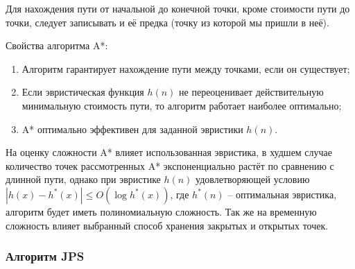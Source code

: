 Для нахождения пути от начальной до конечной точки, кроме стоимости пути до точки, следует записывать и её предка (точку из которой мы пришли в неё).


Свойства алгоритма A*:

\begin{enumerate}
    \item Алгоритм гарантирует нахождение пути между точками, если он существует;
    \item Если эвристическая функция $h(n)$ не переоценивает действительную минимальную стоимость пути, то алгоритм работает наиболее оптимально;
    \item A* оптимально эффективен для заданной эвристики $h(n)$.
\end{enumerate}

На оценку сложности A* влияет использованная эвристика, в худшем случае количество точек рассмотренных A* экспоненциально растёт по сравнению с длинной пути, однако при эвристике $h(n)$ удовлетворяющей условию $|h(x) - h^*(x)| \leq O(\log h^*(x))$, где $h^*(n)$ -- оптимальная эвристика, алгоритм будет иметь полиномиальную сложность. Так же на временную сложность влияет выбранный способ хранения закрытых и открытых точек.

\subsubsection{Алгоритм JPS}

